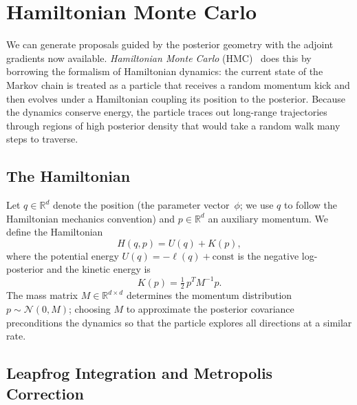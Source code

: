 \chapter{Hamiltonian Monte Carlo}\label{ch:hmc}

We can generate proposals guided by the posterior geometry with the
adjoint gradients now available. \emph{Hamiltonian Monte
Carlo} (HMC)~\cite{betancourt2018hamiltonian,neal2011mcmc} does this by
borrowing the formalism of Hamiltonian dynamics: the current state of
the Markov chain is treated as a particle that receives a random
momentum kick and then evolves under a Hamiltonian coupling its
position to the posterior. Because the dynamics conserve energy, the
particle traces out long-range trajectories through regions of high
posterior density that would take a random walk many steps to traverse.

\section{The Hamiltonian}\label{sec:hamiltonian}
Let $q \in \mathbb{R}^d$ denote the position (the parameter
  vector~$\phi$; we use $q$ to follow the Hamiltonian mechanics
convention) and $p \in \mathbb{R}^d$ an auxiliary momentum. We define
the Hamiltonian
\begin{equation}
  H(q, p) = U(q) + K(p),
  \label{eq:hamiltonian-decomposition}
\end{equation}
where the potential energy $U(q) = -\ell(q) + \text{const}$ is the
negative log-posterior and the kinetic energy is
\begin{equation}
  K(p) = \tfrac{1}{2}\, p^T M^{-1} p.
  \label{eq:kinetic-energy}
\end{equation}
The mass matrix $M \in \mathbb{R}^{d \times d}$ determines the momentum
distribution $p \sim \mathcal{N}(0, M)$; choosing $M$ to approximate the
posterior covariance preconditions the dynamics so that the particle
explores all directions at a similar rate.

\section{Leapfrog Integration and Metropolis
Correction}\label{sec:hmc-algorithm}

